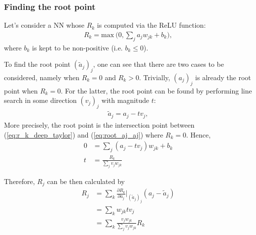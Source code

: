  
 

\subsubsection{Finding the root point} 
Let's consider a NN whose $R_k$ is computed via the ReLU function:
\begin{align}\label{eq:r_k_deep_taylor}
R_k = \text{max}\ \bigg(0, \sum_{j} a_j w_{jk}  + b_k \bigg),
\end{align}
where $b_k$ is kept to be non-positive (i.e. $b_k \le 0$).

To find the root point $(\tilde{a}_j)_j$, one can see that  there are  two cases to be considered, namely when $R_k = 0$ and $R_k > 0$. Trivially, $(a_j)_j$ is already the root point when $R_k=0$. For the latter, the root point can be found by performing  line search in  some direction $(v_j)_j$ with magnitude $t$:
\begin{align}\label{eq:root_aj_aj}
\tilde{a}_j = a_j - t v_j,
\end{align}
More precisely, the root point is the intersection point between (\ref{eq:r_k_deep_taylor}) and (\ref{eq:root_aj_aj}) where $R_k=0$. Hence,
\begin{align*}
  0 &= 	\sum_{j} (a_j - t v_j) w_{jk}  + b_k\\
  t &= \frac{R_k}{\sum_{j} v_j w_{jk}}
\end{align*}

Therefore, $R_j$ can be then calculated by
\begin{align*}
R_j &= \sum_k	\frac{\partial  R_k }{ \partial a_j } \bigg|_{ (\tilde{a}_j)_j }  ( a_j - \tilde{a}_j ) \\
&=	\sum_k w_{jk} tv_j \\
&=	\sum_k \frac{ v_j w_{jk}   }{\sum_{j} v_j w_{jk}}  R_k
\end{align*}


